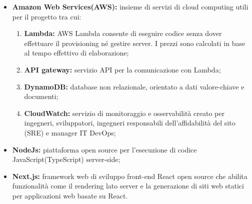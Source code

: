 \begin{itemize}
\item {\bf Amazon Web Services(AWS):} insieme di servizi di cloud computing utili per il progetto tra cui:
\begin{enumerate}
\item {\bf Lambda:} AWS Lambda consente di eseguire codice senza dover effettuare il provisioning né gestire server. I prezzi sono calcolati in base al tempo effettivo di elaborazione;
\item {\bf API gateway:} servizio API per la comunicazione con Lambda;
\item {\bf DynamoDB:} database non relazionale, orientato a dati valore-chiave e documenti;
\item {\bf CloudWatch:} servizio di monitoraggio e osservabilità creato per ingegneri, sviluppatori, ingegneri responsabili dell'affidabilità del sito (SRE) e manager IT DevOps;
\end{enumerate}
\item {\bf NodeJs:} piattaforma open source per l'esecuzione di codice JavaScript(TypeScript) server-side;
\item {\bf Next.js:} framework web di sviluppo front-end React open source che abilita funzionalità come il rendering lato server e la generazione di siti web statici per applicazioni web basate su React. 
\end{itemize}
